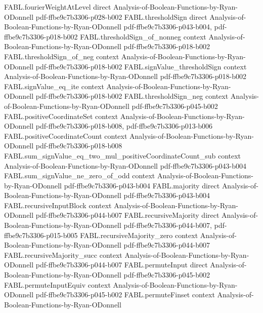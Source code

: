 \begin{theorem}
\proofstep
  {FABL.fourierWeightAtLevel}
  {direct}
  {Analysis-of-Boolean-Functions-by-Ryan-ODonnell}
  {pdf-ffbe9c7b3306-p028-b002}
\proofstep
  {FABL.thresholdSign}
  {direct}
  {Analysis-of-Boolean-Functions-by-Ryan-ODonnell}
  {pdf-ffbe9c7b3306-p043-b004,
    pdf-ffbe9c7b3306-p018-b002}
\proofstep
  {FABL.thresholdSign_of_nonneg}
  {context}
  {Analysis-of-Boolean-Functions-by-Ryan-ODonnell}
  {pdf-ffbe9c7b3306-p018-b002}
\proofstep
  {FABL.thresholdSign_of_neg}
  {context}
  {Analysis-of-Boolean-Functions-by-Ryan-ODonnell}
  {pdf-ffbe9c7b3306-p018-b002}
\proofstep
  {FABL.signValue_thresholdSign}
  {context}
  {Analysis-of-Boolean-Functions-by-Ryan-ODonnell}
  {pdf-ffbe9c7b3306-p018-b002}
\proofstep
  {FABL.signValue_eq_ite}
  {context}
  {Analysis-of-Boolean-Functions-by-Ryan-ODonnell}
  {pdf-ffbe9c7b3306-p018-b002}
\proofstep
  {FABL.thresholdSign_neg}
  {context}
  {Analysis-of-Boolean-Functions-by-Ryan-ODonnell}
  {pdf-ffbe9c7b3306-p045-b002}
\proofstep
  {FABL.positiveCoordinateSet}
  {context}
  {Analysis-of-Boolean-Functions-by-Ryan-ODonnell}
  {pdf-ffbe9c7b3306-p018-b008,
    pdf-ffbe9c7b3306-p013-b006}
\proofstep
  {FABL.positiveCoordinateCount}
  {context}
  {Analysis-of-Boolean-Functions-by-Ryan-ODonnell}
  {pdf-ffbe9c7b3306-p018-b008}
\proofstep
  {FABL.sum_signValue_eq_two_mul_positiveCoordinateCount_sub}
  {context}
  {Analysis-of-Boolean-Functions-by-Ryan-ODonnell}
  {pdf-ffbe9c7b3306-p043-b004}
\proofstep
  {FABL.sum_signValue_ne_zero_of_odd}
  {context}
  {Analysis-of-Boolean-Functions-by-Ryan-ODonnell}
  {pdf-ffbe9c7b3306-p043-b004}
\proofstep
  {FABL.majority}
  {direct}
  {Analysis-of-Boolean-Functions-by-Ryan-ODonnell}
  {pdf-ffbe9c7b3306-p043-b004}
\proofstep
  {FABL.recursiveInputBlock}
  {context}
  {Analysis-of-Boolean-Functions-by-Ryan-ODonnell}
  {pdf-ffbe9c7b3306-p044-b007}
\proofstep
  {FABL.recursiveMajority}
  {direct}
  {Analysis-of-Boolean-Functions-by-Ryan-ODonnell}
  {pdf-ffbe9c7b3306-p044-b007,
    pdf-ffbe9c7b3306-p015-b005}
\proofstep
  {FABL.recursiveMajority_zero}
  {context}
  {Analysis-of-Boolean-Functions-by-Ryan-ODonnell}
  {pdf-ffbe9c7b3306-p044-b007}
\proofstep
  {FABL.recursiveMajority_succ}
  {context}
  {Analysis-of-Boolean-Functions-by-Ryan-ODonnell}
  {pdf-ffbe9c7b3306-p044-b007}
\proofstep
  {FABL.permuteInput}
  {direct}
  {Analysis-of-Boolean-Functions-by-Ryan-ODonnell}
  {pdf-ffbe9c7b3306-p045-b002}
\proofstep
  {FABL.permuteInputEquiv}
  {context}
  {Analysis-of-Boolean-Functions-by-Ryan-ODonnell}
  {pdf-ffbe9c7b3306-p045-b002}
\proofstep
  {FABL.permuteFinset}
  {context}
  {Analysis-of-Boolean-Functions-by-Ryan-ODonnell}

\end{theorem}
